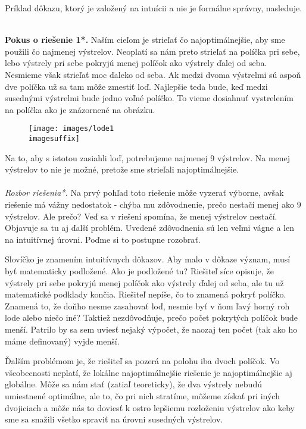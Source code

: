 {Príklad dôkazu, ktorý je založený na intuícii a nie je formálne správny, nasleduje.\\
\\
{\textbf{Pokus o riešenie 1*.}
Naším cieľom je strieľať čo najoptimálnejšie, aby sme použili čo najmenej výstrelov. Neoplatí sa nám preto strieľať na políčka pri sebe, lebo výstrely pri sebe pokryjú menej políčok ako výstrely ďalej od seba. Nesmieme však strieľať moc ďaleko od seba. Ak medzi dvoma výstrelmi sú aspoň dve políčka už sa tam môže zmestiť loď. Najlepšie teda bude, keď medzi susednými výstrelmi bude jedno voľné políčko. To vieme dosiahnuť vystrelením na políčka ako je znázornené na obrázku.
\begin{figure}[h]
    \centering
    \texttt{[image: images/lode1\\imagesuffix]}
    \caption{}
    \label{fig:lode1}
\end{figure}
Na to, aby s istotou zasiahli loď, potrebujeme najmenej 9 výstrelov. Na menej výstrelov to nie je možné, pretože sme strieľali najoptimálnejšie.\\
\\
\textit{Rozbor riešenia*.} Na prvý pohľad toto riešenie môže vyzerať výborne, avšak riešenie má vážny nedostatok - chýba mu zdôvodnenie, prečo nestačí menej ako 9 výstrelov. Ale prečo? Veď sa v riešení spomína, že menej výstrelov nestačí. Objavuje sa tu aj ďalší problém. Uvedené zdôvodnenia sú len veľmi vágne a len na intuitívnej úrovni. Poďme si to postupne rozobrať.

 Slovíčko  je znamením intuitívnych dôkazov. Aby malo v dôkaze význam, musí byť matematicky podložené. Ako je podložené tu? Riešiteľ síce opisuje, že výstrely pri sebe pokryjú menej políčok ako výstrely ďalej od seba, ale tu už matematické podklady končia. Riešiteľ nepíše, čo to znamená pokryť políčko. Znamená to, že doňho nesme zasahovať loď, nesmie byť v ňom ľavý horný roh lode alebo niečo iné? Taktiež nezdôvodňuje, prečo počet pokrytých políčok bude menší. Patrilo by sa sem uviesť nejaký výpočet, že naozaj ten počet (tak ako ho máme definovaný) vyjde menší.

Ďalším problémom je, že riešiteľ sa pozerá na polohu iba dvoch políčok. Vo všeobecnosti neplatí, že lokálne najoptimálnejšie riešenie je najoptimálnejšie aj globálne. Môže sa nám stať (zatiaľ teoreticky), že dva výstrely nebudú umiestnené optimálne, ale to, čo pri nich stratíme, môžeme získať pri iných dvojiciach a môže nás to doviesť k ostro lepšiemu rozloženiu výstrelov ako keby sme sa snažili všetko spraviť  na úrovni susedných výstrelov.

}}
